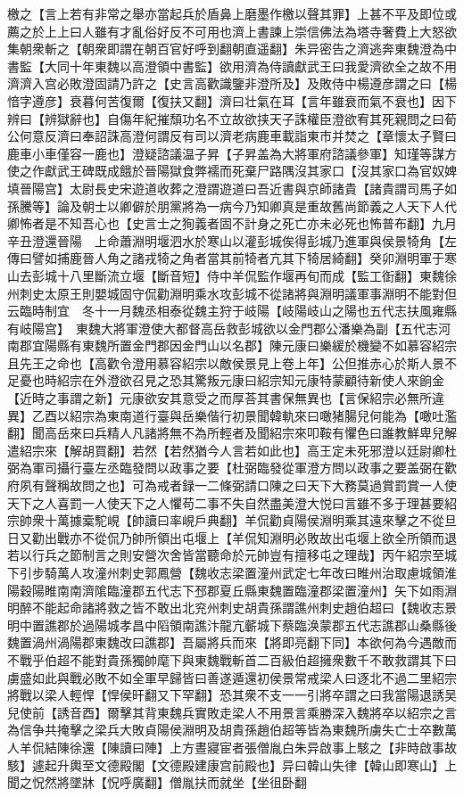 檄之【言上若有非常之舉亦當起兵於盾鼻上磨墨作檄以聲其罪】上甚不平及即位或薦之於上上曰人雖有才亂俗好反不可用也濟上書諫上崇信佛法為塔寺奢費上大怒欲集朝衆斬之【朝衆即謂在朝百官好呼到翻朝直遥翻】朱异密告之濟逃奔東魏澄為中書監【大同十年東魏以高澄領中書監】欲用濟為侍讀獻武王曰我愛濟欲全之故不用濟濟入宫必敗澄固請乃許之【史言高歡識鑒非澄所及】及敗侍中楊遵彦謂之曰【楊愔字遵彦】衰暮何苦復爾【復扶又翻】濟曰壮氣在耳【言年雖衰而氣不衰也】因下辨曰【辨獄辭也】自傷年紀摧頹功名不立故欲挟天子誅權臣澄欲宥其死親問之曰荀公何意反濟曰奉詔誅高澄何謂反有司以濟老病鹿車載詣東市并焚之【章懷太子賢曰鹿車小車僅容一鹿也】澄疑諮議温子昇【子昇盖為大將軍府諮議參軍】知瑾等謀方使之作獻武王碑既成餓於晉陽獄食弊襦而死棄尸路隅沒其家口【沒其家口為官奴婢填晉陽宫】太尉長史宋遊道收葬之澄謂遊道曰吾近書與京師諸貴【諸貴謂司馬子如孫騰等】論及朝士以卿僻於朋黨將為一病今乃知卿真是重故舊尚節義之人天下人代卿怖者是不知吾心也【史言士之狥義者固不計身之死亡亦未必死也怖普布翻】九月辛丑澄還晉陽　上命蕭淵明堰泗水於寒山以灌彭城俟得彭城乃進軍與侯景犄角【左傳曰譬如捕鹿晉人角之諸戎犄之角者當其前犄者亢其下犄居綺翻】癸卯淵明軍于寒山去彭城十八里斷流立堰【斷音短】侍中羊侃監作堰再旬而成【監工衘翻】東魏徐州刺史太原王則嬰城固守侃勸淵明乘水攻彭城不從諸將與淵明議軍事淵明不能對但云臨時制宜　冬十一月魏丞相泰從魏主狩于岐陽【岐陽岐山之陽也五代志扶風雍縣有岐陽宫】　東魏大將軍澄使大都督高岳救彭城欲以金門郡公潘樂為副【五代志河南郡宜陽縣有東魏所置金門郡因金門山以名郡】陳元康曰樂緩於機變不如慕容紹宗且先王之命也【高歡令澄用慕容紹宗以敵侯景見上卷上年】公但推赤心於斯人景不足憂也時紹宗在外澄欲召見之恐其驚叛元康曰紹宗知元康特蒙顧待新使人來餉金【近時之事謂之新】元康欲安其意受之而厚荅其書保無異也【言保紹宗必無所違異】乙酉以紹宗為東南道行臺與岳樂偕行初景聞韓軌來曰噉猪腸兒何能為【噉吐濫翻】聞高岳來曰兵精人凡諸將無不為所輕者及聞紹宗來叩鞍有懼色曰誰教鮮卑兒解遣紹宗來【解胡買翻】若然【若然猶今人言若如此也】高王定未死邪澄以廷尉卿杜弼為軍司攝行臺左丞臨發問以政事之要【杜弼臨發從軍澄方問以政事之要盖弼在歡府夙有聲稱故問之也】可為戒者録一二條弼請口陳之曰天下大務莫過賞罰賞一人使天下之人喜罰一人使天下之人懼苟二事不失自然盡美澄大悦曰言雖不多于理甚要紹宗帥衆十萬據槖駝峴【帥讀曰率峴戶典翻】羊侃勸貞陽侯淵明乘其遠來擊之不從旦日又勸出戰亦不從侃乃帥所領出屯堰上【羊侃知淵明必敗故出屯堰上欲全所領而退若以行兵之節制言之則安營次舍皆當聽命於元帥豈有擅移屯之理哉】丙午紹宗至城下引步騎萬人攻潼州刺史郭鳳營【魏收志梁置潼州武定七年改曰睢州治取慮城領淮陽穀陽睢南南濟隂臨潼郡五代志下邳郡夏丘縣東魏置臨潼郡梁置潼州】矢下如雨淵明醉不能起命諸將救之皆不敢出北兖州刺史胡貴孫謂譙州刺史趙伯超曰【魏收志景明中置譙郡於過陽城孝昌中䧟領南譙汴龍亢蘄城下蔡臨涣蒙郡五代志譙郡山桑縣後魏置渦州渦陽郡東魏改曰譙郡】吾屬將兵而來【將即亮翻下同】本欲何為今遇敵而不戰乎伯超不能對貴孫獨帥麾下與東魏戰斬首二百級伯超擁衆數千不敢救謂其下曰虜盛如此與戰必敗不如全軍早歸皆曰善遂遁還初侯景常戒梁人曰逐北不過二里紹宗將戰以梁人輕悍【悍侯旰翻又下罕翻】恐其衆不支一一引將卒謂之曰我當陽退誘吴兒使前【誘音酉】爾擊其背東魏兵實敗走梁人不用景言乘勝深入魏將卒以紹宗之言為信争共掩擊之梁兵大敗貞陽侯淵明及胡貴孫趙伯超等皆為東魏所虜失亡士卒數萬人羊侃結陳徐還【陳讀曰陣】上方晝寢宦者張僧胤白朱异啟事上駭之【非時啟事故駭】遽起升輿至文德殿閣【文德殿建康宫前殿也】异曰韓山失律【韓山即寒山】上聞之怳然將墜牀【怳呼廣翻】僧胤扶而就坐【坐徂卧翻